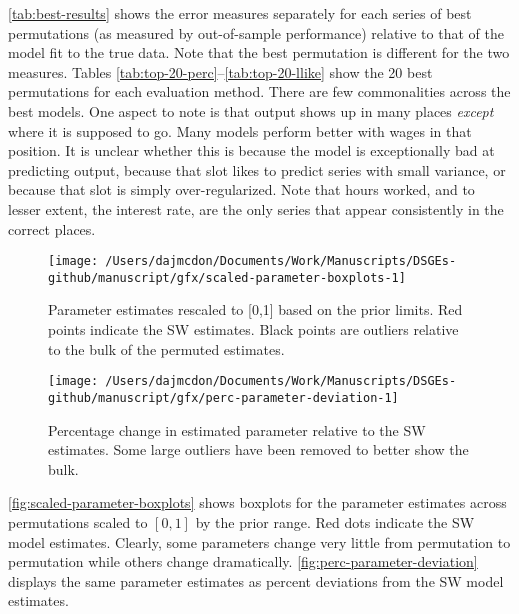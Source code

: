 \documentclass[11pt]{article}
\begin{document}
\autoref{tab:best-results} shows the error measures separately for each
series of best permutations (as measured by out-of-sample performance)
relative to that of the model fit to the true data. Note that the best
permutation is different for the two measures. Tables
\ref{tab:top-20-perc}--\ref{tab:top-20-llike} show the 20 best
permutations for each evaluation method. There are few commonalities
across the best models. One aspect to note is that output shows up in
many places \emph{except} where it is supposed to go. Many models
perform better with wages in that position. It is unclear whether this
is because the model is exceptionally bad at predicting output, because
that slot likes to predict series with small variance, or because that
slot is simply over-regularized. Note that hours worked, and to lesser
extent, the interest rate, are the only series that appear consistently
in the correct places.

\begin{figure}[t]

{\centering \texttt{[image: /Users/dajmcdon/Documents/Work/Manuscripts/DSGEs-github/manuscript/gfx/scaled-parameter-boxplots-1]} 

}

\caption{Parameter estimates rescaled to [0,1] based on the prior limits. Red points indicate the SW estimates. Black points are outliers relative to the bulk of the permuted estimates.}\label{fig:scaled-parameter-boxplots}
\end{figure}

\begin{figure}[t]

{\centering \texttt{[image: /Users/dajmcdon/Documents/Work/Manuscripts/DSGEs-github/manuscript/gfx/perc-parameter-deviation-1]} 

}

\caption{Percentage change in estimated parameter relative to the SW estimates. Some large outliers have been removed to better show the bulk.}\label{fig:perc-parameter-deviation}
\end{figure}

\autoref{fig:scaled-parameter-boxplots} shows boxplots for the parameter
estimates across permutations scaled to \([0,1]\) by the prior range.
Red dots indicate the SW model estimates. Clearly, some parameters
change very little from permutation to permutation while others change
dramatically. \autoref{fig:perc-parameter-deviation} displays the same
parameter estimates as percent deviations from the SW model estimates.
\end{document}
